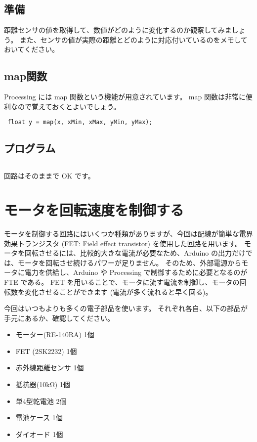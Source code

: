 \documentclass[11pt,a4paper]{jarticle}
\begin{document}
\subsection*{準備}
距離センサの値を取得して、数値がどのように変化するのか観察してみましょう。
また、センサの値が実際の距離とどのように対応付いているのをメモしておいてください。


\subsection*{map関数}
Processing には map 関数という機能が用意されています。
map 関数は非常に便利なので覚えておくとよいでしょう。
\begin{lstlisting}
 float y = map(x, xMin, xMax, yMin, yMax);
\end{lstlisting}

\subsection*{プログラム}
\begin{lstlisting}

\end{lstlisting}

回路はそのままで OK です。


\section{モータを回転速度を制御する}
モータを制御する回路にはいくつか種類がありますが、今回は配線が簡単な電界効果トランジスタ (FET: Field effect transistor) を使用した回路を用います。
モータを回転させるには、比較的大きな電流が必要なため、Arduino の出力だけでは、モータを回転させ続けるパワーが足りません。
そのため、外部電源からモータに電力を供給し、Arduino や Processing で制御するために必要となるのが FTE である。
FET を用いることで、モータに流す電流を制御し、モータの回転数を変化させることができます (電流が多く流れると早く回る)。


今回はいつもよりも多くの電子部品を使います。
それぞれ各自、以下の部品が手元にあるか、確認してください。
\begin{itemize}
 \item モーター(RE-140RA) 1個
 \item FET (2SK2232) 1個
 \item 赤外線距離センサ 1個
 \item 抵抗器(10kΩ) 1個
 \item 単4型乾電池 2個
 \item 電池ケース 1個
 \item ダイオード 1個
\end{itemize}
\end{document}
